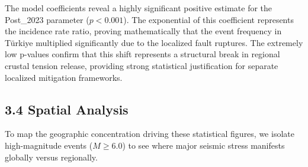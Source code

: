 \documentclass[
  11pt,
  a4paper,
  DIV=11,
  numbers=noendperiod]{scrartcl}
\begin{document}
The model coefficients reveal a highly significant positive estimate for
the Post\_2023 parameter (\(p < 0.001\)). The exponential of this
coefficient represents the incidence rate ratio, proving mathematically
that the event frequency in Türkiye multiplied significantly due to the
localized fault ruptures. The extremely low p-values confirm that this
shift represents a structural break in regional crustal tension release,
providing strong statistical justification for separate localized
mitigation frameworks.

\subsection{3.4 Spatial Analysis}\label{spatial-analysis}

To map the geographic concentration driving these statistical figures,
we isolate high-magnitude events (\(M \ge 6.0\)) to see where major
seismic stress manifests globally versus regionally.
\end{document}
